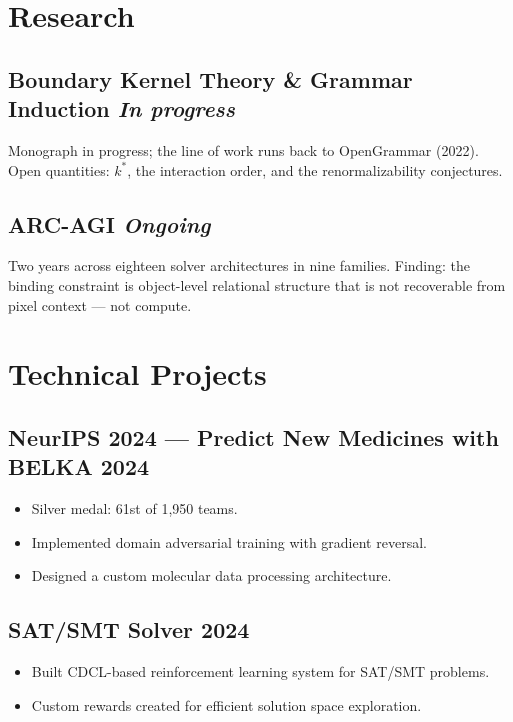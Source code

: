 \documentclass[11pt]{article}
\begin{document}
\section{Research}
\subsection{Boundary Kernel Theory \& Grammar Induction \hspace*{\fill} \textit{In progress}}
Monograph in progress; the line of work runs back to OpenGrammar (2022). Open quantities: $k^*$, the interaction order, and the renormalizability conjectures.

\subsection{ARC-AGI \hspace*{\fill} \textit{Ongoing}}
Two years across eighteen solver architectures in nine families. Finding: the binding constraint is
object-level relational structure that is not recoverable from pixel context --- not compute.

\section{Technical Projects}
\subsection{NeurIPS 2024 --- Predict New Medicines with BELKA \hspace*{\fill} 2024}
\begin{itemize}
    \item Silver medal: 61st of 1,950 teams.
    \item Implemented domain adversarial training with gradient reversal.
    \item Designed a custom molecular data processing architecture.
\end{itemize}

\subsection{SAT/SMT Solver \hspace*{\fill} 2024}
\begin{itemize}
    \item Built CDCL-based reinforcement learning system for SAT/SMT problems.
    \item Custom rewards created for efficient solution space exploration.
\end{itemize}
\end{document}
